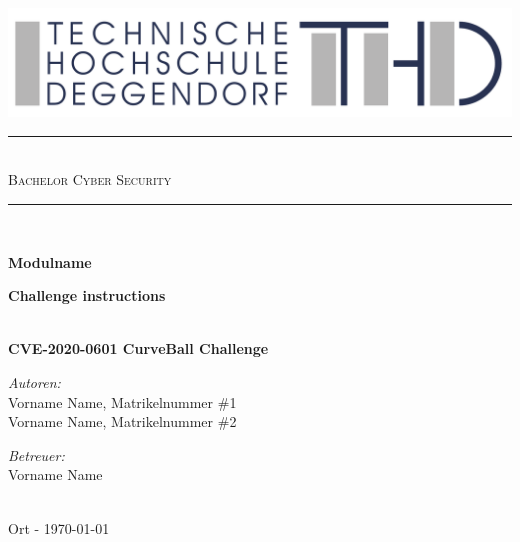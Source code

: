 \documentclass{article}
\begin{document}

\begin{titlepage}
	\begin{center}
		
        \includegraphics[width=\textwidth]{THD-Logo.pdf}
	
	    \vspace{1cm}
	
		\rule{1\textwidth}{1mm} \\[0.3cm]

		\textsc{\scshape \huge Bachelor Cyber Security}\\
		
		\rule{1\textwidth}{1mm} \\[2cm] 
		
		{ 
			 \vspace{1cm}
			 
			 \Large \textbf{Modulname}
			 
			 \vspace{3cm}
			 \Large \textbf{Challenge instructions}}\\[0.5cm]
			 \LARGE \textbf{CVE-2020-0601 CurveBall Challenge}\\[2cm]
		\begin{minipage}[t]{0.4\textwidth}
			\begin{flushleft} \normalsize
				\emph{Autoren:}\\[0.3cm]
				
			    Vorname Name, Matrikelnummer \#1\\
			    Vorname Name, Matrikelnummer \#2\\
				
			\end{flushleft}
		\end{minipage}
		\begin{minipage}[t]{0.5\textwidth}
			\begin{flushright} \normalsize
				\emph{Betreuer:}\\[0.3cm]
				
    			Vorname Name 
				
			\end{flushright}
		\end{minipage}\\[3cm]
		{\large Ort - \today\\}	
		\vspace{3cm}
	\end{center}
\end{titlepage}
\end{document}
